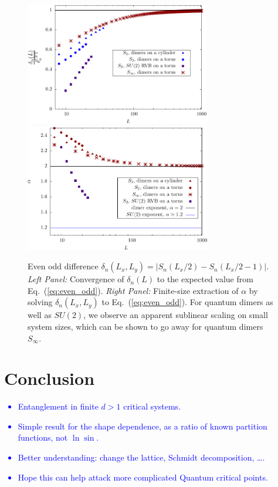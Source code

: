 \documentclass[11pt]{iopart}
\begin{document}
\begin{figure}[ht]
\begin{center}
 \includegraphics[width=8.1cm]{./figures/evenodd.pdf}
 \includegraphics[width=8.1cm]{./figures/evenodd_alpha.pdf}
 \end{center}
 \caption{Even odd difference $\delta_n(L_x,L_y)=|S_n(L_x/2)-S_n(L_x/2-1)|$. \emph{Left Panel:} Convergence of $\delta_n(L)$ to the expected value from Eq.~(\ref{eq:even_odd}). \emph{Right Panel:} Finite-size extraction of $\alpha$ by solving $\delta_n(L_x,L_y)$ to Eq.~(\ref{eq:even_odd}). For quantum dimers as well as $SU(2)$, we observe an apparent sublinear scaling on small system sizes, which can be shown to go away for quantum dimers $S_\infty$.}
 \label{fig:evenodd}
\end{figure}

\section{Conclusion}
\label{sec:conclusion}
\textcolor{blue}{
\begin{itemize}
 \item Entanglement in finite $d>1$ critical systems. 
 \item Simple result for the shape dependence, as a ratio of known partition functions, not $\ln \sin$.
 \item Better understanding: change the lattice, Schmidt decomposition, \ldots.
 \item Hope this can help attack more complicated Quantum critical points.
\end{itemize}
}
\end{document}
